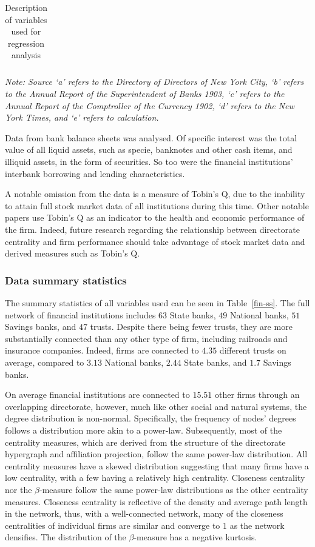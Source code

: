\documentclass[11pt,fleqn]{article}
\begin{document}
\begin{table}[t!]
{\begin{tabular}{lll}
			\bottomrule
		\end{tabular}
	}
	\begin{flushleft}
		\emph{Note: Source `a' refers to the Directory of Directors of New York City, `b' refers to the Annual Report of the Superintendent of Banks 1903, `c' refers to the Annual Report of the Comptroller of the Currency 1902, `d' refers to the New York Times, and `e' refers to calculation.}
	\end{flushleft}
	\caption{Description of variables used for regression analysis}
	\label{vardesc}
\end{table}

Data from bank balance sheets was analysed. Of specific interest was the total value of all liquid assets, such as specie, banknotes and other cash items, and illiquid assets, in the form of securities. So too were the financial institutions' interbank borrowing and lending characteristics.

A notable omission from the data is a measure of Tobin's Q, due to the inability to attain full stock market data of all institutions during this time. Other notable papers use Tobin's Q as an indicator to the health and economic performance of the firm. Indeed, future research regarding the relationship between directorate centrality and firm performance should take advantage of stock market data and derived measures such as Tobin's Q.

\subsubsection*{Data summary statistics}

The summary statistics of all variables used can be seen in Table~\ref{fin-ss}. The full network of financial institutions includes $63$ State banks, $49$ National banks, $51$ Savings banks, and $47$ trusts. Despite there being fewer trusts, they are more substantially connected than any other type of firm, including railroads and insurance companies. Indeed, firms are connected to $4.35$ different trusts on average, compared to $3.13$ National banks, $2.44$ State banks, and $1.7$ Savings banks.

On average financial institutions are connected to $15.51$ other firms through an overlapping directorate, however, much like other social and natural systems, the degree distribution is non-normal. Specifically, the frequency of nodes' degrees follows a distribution more akin to a power-law. Subsequently, most of the centrality measures, which are derived from the structure of the directorate hypergraph and affiliation projection, follow the same power-law distribution. All centrality measures have a skewed distribution suggesting that many firms have a low centrality, with a few having a relatively high centrality. Closeness centrality nor the $\beta$-measure follow the same power-law distributions as the other centrality measures. Closeness centrality is reflective of the density and average path length in the network, thus, with a well-connected network, many of the closeness centralities of individual firms are similar and converge to $1$ as the network densifies. The distribution of the $\beta$-measure has a negative kurtosis.
\end{document}
